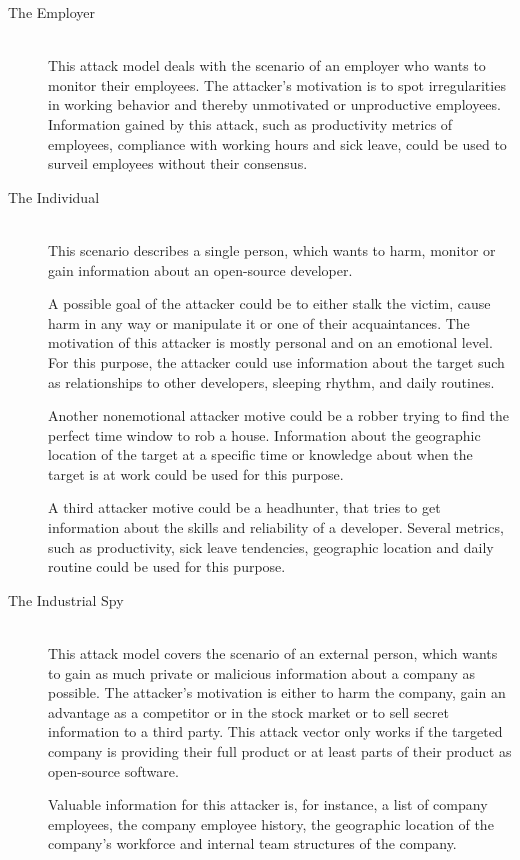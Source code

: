 \begin{description}
    \item[The Employer] \hfill \\
        This attack model deals with the scenario of an employer who wants to monitor their employees.
        The attacker's motivation is to spot irregularities in working behavior and thereby unmotivated or unproductive employees.
        Information gained by this attack, such as productivity metrics of employees, compliance with working hours and sick leave, could be used to surveil employees without their consensus.

    \item[The Individual] \hfill \\
        This scenario describes a single person, which wants to harm, monitor or gain information about an open-source developer.

        A possible goal of the attacker could be to either stalk the victim, cause harm in any way or manipulate it or one of their acquaintances.
        The motivation of this attacker is mostly personal and on an emotional level.
        For this purpose, the attacker could use information about the target such as relationships to other developers, sleeping rhythm, and daily routines.

        Another nonemotional attacker motive could be a robber trying to find the perfect time window to rob a house.
        Information about the geographic location of the target at a specific time or knowledge about when the target is at work could be used for this purpose.

        A third attacker motive could be a headhunter, that tries to get information about the skills and reliability of a developer.
        Several metrics, such as productivity, sick leave tendencies, geographic location and daily routine could be used for this purpose.

    \item[The Industrial Spy]~\label{attack:industrial-spy} \hfill \\
        This attack model covers the scenario of an external person, which wants to gain as much private or malicious information about a company as possible.
        The attacker's motivation is either to harm the company, gain an advantage as a competitor or in the stock market or to sell secret information to a third party.
        This attack vector only works if the targeted company is providing their full product or at least parts of their product as open-source software.

        Valuable information for this attacker is, for instance, a list of company employees, the company employee history, the geographic location of the company's workforce and internal team structures of the company.
\end{description}


